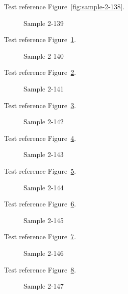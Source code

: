 Test reference Figure~\ref{fig:sample-2-138}.

\begin{figure}[tbhp]
\caption{Sample 2-139}
\label{fig:sample-2-139}
\end{figure}

Test reference Figure~\ref{fig:sample-2-139}.

\begin{figure}[tbhp]
\caption{Sample 2-140}
\label{fig:sample-2-140}
\end{figure}

Test reference Figure~\ref{fig:sample-2-140}.

\begin{figure}[tbhp]
\caption{Sample 2-141}
\label{fig:sample-2-141}
\end{figure}

Test reference Figure~\ref{fig:sample-2-141}.

\begin{figure}[tbhp]
\caption{Sample 2-142}
\label{fig:sample-2-142}
\end{figure}

Test reference Figure~\ref{fig:sample-2-142}.

\begin{figure}[tbhp]
\caption{Sample 2-143}
\label{fig:sample-2-143}
\end{figure}

Test reference Figure~\ref{fig:sample-2-143}.

\begin{figure}[tbhp]
\caption{Sample 2-144}
\label{fig:sample-2-144}
\end{figure}

Test reference Figure~\ref{fig:sample-2-144}.

\begin{figure}[tbhp]
\caption{Sample 2-145}
\label{fig:sample-2-145}
\end{figure}

Test reference Figure~\ref{fig:sample-2-145}.

\begin{figure}[tbhp]
\caption{Sample 2-146}
\label{fig:sample-2-146}
\end{figure}

Test reference Figure~\ref{fig:sample-2-146}.

\begin{figure}[tbhp]
\caption{Sample 2-147}
\label{fig:sample-2-147}
\end{figure}

